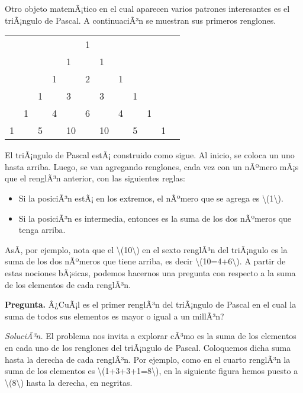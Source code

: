 \documentclass[
]{article}
\begin{document}
Otro objeto matemÃ¡tico en el cual aparecen varios patrones interesantes
es el triÃ¡ngulo de Pascal. A continuaciÃ³n se muestran sus primeros
renglones.

\begin{longtable}[]{@{}llllllllllll@{}}
\toprule\noalign{}
& & & & & & & & & & & \\
\midrule\noalign{}
\endhead
\bottomrule\noalign{}
\endlastfoot
& & & & & 1 & & & & & & \\
& & & & 1 & & 1 & & & & & \\
& & & 1 & & 2 & & 1 & & & & \\
& & 1 & & 3 & & 3 & & 1 & & & \\
& 1 & & 4 & & 6 & & 4 & & 1 & & \\
1 & & 5 & & 10 & & 10 & & 5 & & 1 & \\
\end{longtable}

El triÃ¡ngulo de Pascal estÃ¡ construido como sigue. Al inicio, se
coloca un uno hasta arriba. Luego, se van agregando renglones, cada vez
con un nÃºmero mÃ¡s que el renglÃ³n anterior, con las siguientes reglas:

\begin{itemize}
\item
  Si la posiciÃ³n estÃ¡ en los extremos, el nÃºmero que se agrega es
  {\textbackslash(1\textbackslash)}.
\item
  Si la posiciÃ³n es intermedia, entonces es la suma de los dos nÃºmeros
  que tenga arriba.
\end{itemize}

AsÃ­, por ejemplo, nota que el {\textbackslash(10\textbackslash)} en el
sexto renglÃ³n del triÃ¡ngulo es la suma de los dos nÃºmeros que tiene
arriba, es decir {\textbackslash(10=4+6\textbackslash)}. A partir de
estas nociones bÃ¡sicas, podemos hacernos una pregunta con respecto a la
suma de los elementos de cada renglÃ³n.

\textbf{Pregunta.} Â¿CuÃ¡l es el primer renglÃ³n del triÃ¡ngulo de
Pascal en el cual la suma de todos sus elementos es mayor o igual a un
millÃ³n?

\emph{SoluciÃ³n.} El problema nos invita a explorar cÃ³mo es la suma de
los elementos en cada uno de los renglones del triÃ¡ngulo de Pascal.
Coloquemos dicha suma hasta la derecha de cada renglÃ³n. Por ejemplo,
como en el cuarto renglÃ³n la suma de los elementos es
{\textbackslash(1+3+3+1=8\textbackslash)}, en la siguiente figura hemos
puesto a {\textbackslash(8\textbackslash)} hasta la derecha, en
negritas.
\end{document}
